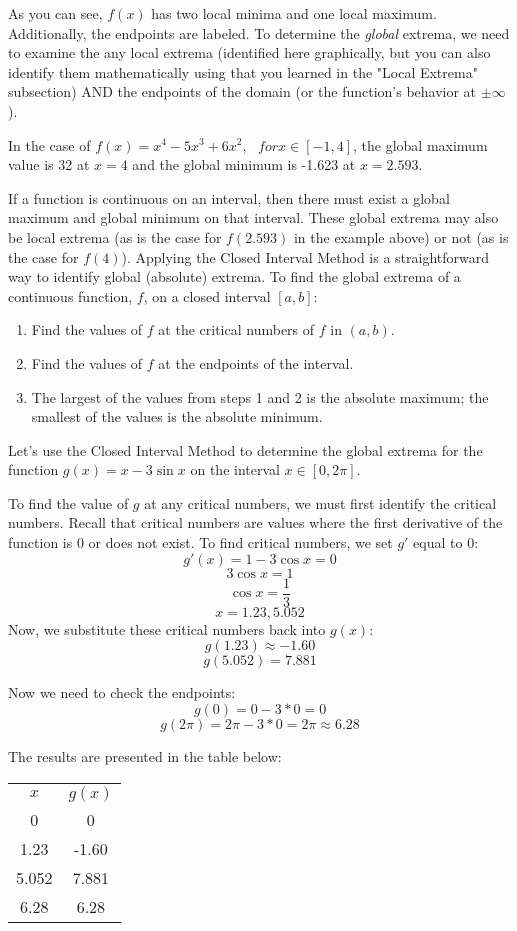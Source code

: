As you can see, $f(x)$ has two local minima and one local maximum. Additionally, the endpoints are labeled. To determine the \textit{global} extrema, we need to examine the any local extrema (identified here graphically, but you can also identify them mathematically using that you learned in the "Local Extrema" subsection) AND the endpoints of the domain (or the function's behavior at $\pm \infty$). 

In the case of $f(x) = x^4-5x^3+6x^2,\text{ }for x\in [-1,4]$, the global maximum value is 32 at $x=4$ and the global minimum is -1.623 at $x=2.593$. 

If a function is continuous on an interval, then there must exist a global maximum and global minimum on that interval. These global extrema may also be local extrema (as is the case for $f(2.593)$ in the example above) or not (as is the case for $f(4)$). Applying the Closed Interval Method is a straightforward way to identify global (absolute) extrema. To find the global extrema of a continuous function, $f$, on a closed interval $[a, b]$:
\begin{enumerate}
\item Find the values of $f$ at the critical numbers of $f$ in $(a, b)$.
\item Find the values of $f$ at the endpoints of the interval.
\item The largest of the values from steps 1 and 2 is the absolute maximum; the smallest of the values is the absolute minimum.
\end{enumerate}

Let's use the Closed Interval Method to determine the global extrema for the function $g(x) = x-3\sin{x}$ on the interval $x \in [0, 2\pi]$.

To find the value of $g$ at any critical numbers, we must first identify the critical numbers. Recall that critical numbers are values where the first derivative of the function is $0$ or does not exist. To find critical numbers, we set $g'$ equal to $0$:
$$g'(x) = 1-3\cos{x}=0$$
$$3\cos{x} = 1$$
$$\cos{x} = \frac{1}{3}$$
$$x=1.23, 5.052$$
Now, we substitute these critical numbers back into $g(x)$:
$$g(1.23) \approx -1.60$$
$$g(5.052) = 7.881$$

Now we need to check the endpoints:
$$g(0) = 0-3*0 = 0$$
$$g(2\pi) = 2\pi - 3*0 = 2\pi \approx 6.28$$

The results are presented in the table below:

\begin{tabular}{c | c}
$x$ & $g(x)$\\
0 & 0\\
1.23 & -1.60\\
5.052 & 7.881\\
6.28 & 6.28\\
\end{tabular}

